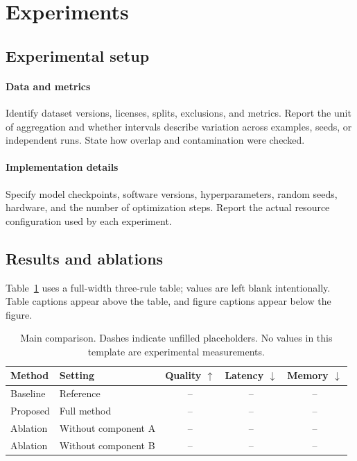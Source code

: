 \section{Experiments}\label{sec:experiments}
\subsection{Experimental setup}
\paragraph{Data and metrics}
Identify dataset versions, licenses, splits, exclusions, and metrics. Report
the unit of aggregation and whether intervals describe variation across
examples, seeds, or independent runs. State how overlap and contamination
were checked.

\paragraph{Implementation details}
Specify model checkpoints, software versions, hyperparameters, random seeds,
hardware, and the number of optimization steps. Report the actual resource
configuration used by each experiment.

\subsection{Results and ablations}
Table~\ref{tab:results} uses a full-width three-rule table; values are left
blank intentionally. Table captions appear above the table, and figure
captions appear below the figure.
\begin{table}[ht]
\caption{Main comparison. Dashes indicate unfilled placeholders. No values in
this template are experimental measurements.}\label{tab:results}
\centering
\begin{tabular*}{\linewidth}{@{\extracolsep{\fill}}llccc@{}}
\toprule
Method & Setting & Quality $\uparrow$ & Latency $\downarrow$ & Memory $\downarrow$\\
\midrule
Baseline & Reference & -- & -- & --\\
Proposed & Full method & -- & -- & --\\
\midrule
Ablation & Without component A & -- & -- & --\\
Ablation & Without component B & -- & -- & --\\
\bottomrule
\end{tabular*}
\end{table}

